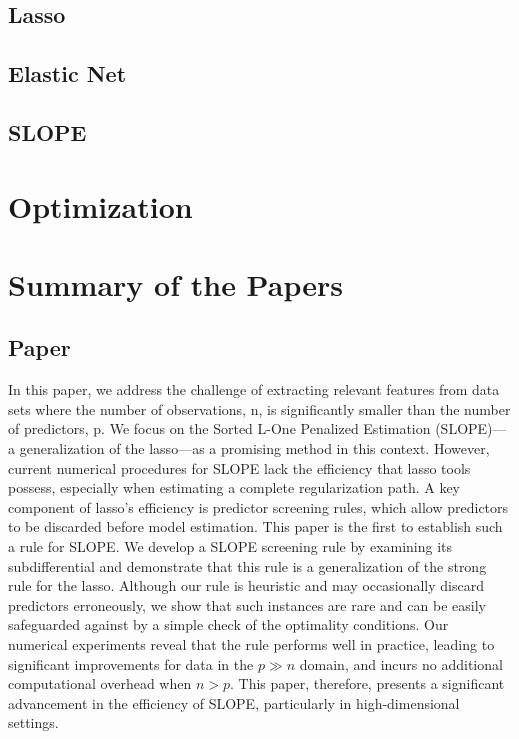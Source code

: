 \documentclass{book}
\begin{document}
\subsection{Lasso}

\subsection{Elastic Net}

\subsection{SLOPE}

\section{Optimization}

\section{Summary of the Papers}

\subsection{Paper \I}

In this paper, we address the challenge of extracting relevant features from data sets where the number of observations, n, is significantly smaller than the number of predictors, p. We focus on the Sorted L-One Penalized Estimation (SLOPE)—a generalization of the lasso—as a promising method in this context. However, current numerical procedures for SLOPE lack the efficiency that lasso tools possess, especially when estimating a complete regularization path. A key component of lasso's efficiency is predictor screening rules, which allow predictors to be discarded before model estimation. This paper is the first to establish such a rule for SLOPE. We develop a SLOPE screening rule by examining its subdifferential and demonstrate that this rule is a generalization of the strong rule for the lasso. Although our rule is heuristic and may occasionally discard predictors erroneously, we show that such instances are rare and can be easily safeguarded against by a simple check of the optimality conditions. Our numerical experiments reveal that the rule performs well in practice, leading to significant improvements for data in the \(p \gg n\) domain, and incurs no additional computational overhead when \(n > p\). This paper, therefore, presents a significant advancement in the efficiency of SLOPE, particularly in high-dimensional settings.
\end{document}
